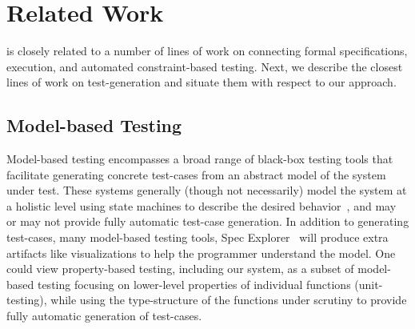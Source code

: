 \section{Related Work} \label{sec:related}

\toolname is closely related to a number of lines of work on connecting
formal specifications, execution, and automated constraint-based testing. 
Next, we describe the closest lines of work on test-generation and 
situate them with respect to our approach.

\subsection{Model-based Testing}
\label{sec:model-based-testing}
Model-based testing encompasses a broad range of black-box testing tools that
facilitate generating concrete test-cases from an abstract model of the system
under test. These systems generally (though not necessarily) model the system at
a holistic level using state machines to describe the desired
behavior~\cite{DiasNeto:2007:SMT:1353673.1353681}, and may or may not provide
fully automatic test-case generation. In addition to generating test-cases, many
model-based testing tools, \eg Spec Explorer~\cite{Veanes08} will produce extra artifacts
like visualizations to help the programmer understand the model. One could view
property-based testing, including our system, as a subset of model-based testing
focusing on lower-level properties of individual functions (unit-testing),
while using the type-structure of the functions under scrutiny to provide fully
automatic generation of test-cases.

